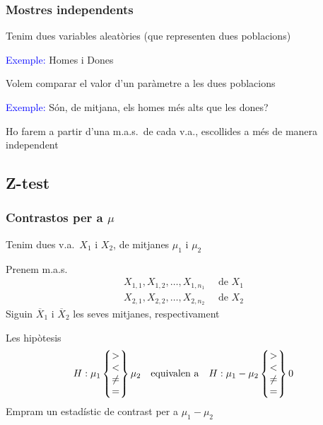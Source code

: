 \documentclass[12pt,t]{beamer}\usepackage[]{graphicx}\usepackage[]{color}
\newcommand{\blue}[1]{\textcolor{blue}{#1}}
\theoremstyle{plain}
\theoremstyle{definition}
\begin{document}
\begin{frame}
\frametitle{Mostres independents}

Tenim dues variables aleatòries  (que representen dues poblacions)
\medskip

\blue{Exemple:} Homes i Dones
\bigskip

Volem comparar el valor d'un paràmetre a  les dues poblacions
\medskip

\blue{Exemple:} Són, de mitjana, els homes més alts que les dones?
\bigskip

Ho farem a partir d'una m.a.s.\ de cada v.a., escollides a més de manera independent
\end{frame}

\subsection{Z-test}

\begin{frame}
\frametitle{Contrastos per a $\mu$}

Tenim dues v.a.\ $X_1$ i $X_2$, de mitjanes $\mu_1$ i $\mu_2$
\medskip

Prenem m.a.s.
$$
\begin{array}{l}
X_{1,1}, X_{1,2},\ldots, X_{1,n_1}\quad\mbox{ de }X_1\\
X_{2,1}, X_{2,2},\ldots, X_{2,n_2}\quad\mbox{ de }X_2
\end{array}
$$
Siguin $\overline{X}_1$ i $\overline{X}_2$  les seves mitjanes, respectivament
\medskip

Les hipòtesis
$$
H: \mu_1\left\{\hspace*{-1ex}\begin{array}{c} > \\ < \\ \neq\\ = \end{array}\hspace*{-1ex}\right\}\mu_2 \mbox{\quad equivalen a\quad }
H: \mu_1-\mu_2\left\{\hspace*{-1ex}\begin{array}{c} > \\ < \\ \neq\\ = \end{array}\hspace*{-1ex}\right\}0
$$
Empram un estadístic de contrast per a $\mu_1-\mu_2$
\end{frame}
\end{document}
